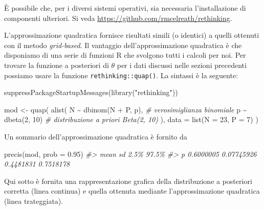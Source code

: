 \documentclass[
]{memoir}
\newenvironment{Shaded}{\begin{snugshade}}{\end{snugshade}}
\newcommand{\AttributeTok}[1]{\textcolor[rgb]{0.77,0.63,0.00}{#1}}
\newcommand{\CommentTok}[1]{\textcolor[rgb]{0.56,0.35,0.01}{\textit{#1}}}
\newcommand{\DecValTok}[1]{\textcolor[rgb]{0.00,0.00,0.81}{#1}}
\newcommand{\FloatTok}[1]{\textcolor[rgb]{0.00,0.00,0.81}{#1}}
\newcommand{\FunctionTok}[1]{\textcolor[rgb]{0.00,0.00,0.00}{#1}}
\newcommand{\NormalTok}[1]{#1}
\newcommand{\OtherTok}[1]{\textcolor[rgb]{0.56,0.35,0.01}{#1}}
\newcommand{\SpecialCharTok}[1]{\textcolor[rgb]{0.00,0.00,0.00}{#1}}
\newcommand{\StringTok}[1]{\textcolor[rgb]{0.31,0.60,0.02}{#1}}
\begin{document}
È possibile che, per i diversi sistemi operativi, sia necessaria l'installazione di componenti ulteriori. Si veda \url{https://github.com/rmcelreath/rethinking}.

L'approssimazione quadratica fornisce risultati simili (o identici) a quelli ottenuti con il metodo \emph{grid-based}. Il vantaggio dell'approssimazione quadratica è che disponiamo di una serie di funzioni R che svolgono tutti i calcoli per noi. Per trovare la funzione a posteriori di \(\theta\) per i dati discussi nelle sezioni precedenti possiamo usare la funzione \texttt{rethinking::quap()}. La sintassi è la seguente:

\begin{Shaded}
\begin{Highlighting}[]
\FunctionTok{suppressPackageStartupMessages}\NormalTok{(}\FunctionTok{library}\NormalTok{(}\StringTok{"rethinking"}\NormalTok{))}

\NormalTok{mod }\OtherTok{\textless{}{-}} \FunctionTok{quap}\NormalTok{(}
  \FunctionTok{alist}\NormalTok{(}
\NormalTok{  N }\SpecialCharTok{\textasciitilde{}} \FunctionTok{dbinom}\NormalTok{(N }\SpecialCharTok{+}\NormalTok{ P, p), }\CommentTok{\# verosimiglianza binomiale}
\NormalTok{  p }\SpecialCharTok{\textasciitilde{}} \FunctionTok{dbeta}\NormalTok{(}\DecValTok{2}\NormalTok{, }\DecValTok{10}\NormalTok{) }\CommentTok{\# distribuzione a priori Beta(2, 10)}
\NormalTok{  ),}
  \AttributeTok{data =} \FunctionTok{list}\NormalTok{(}\AttributeTok{N =} \DecValTok{23}\NormalTok{, }\AttributeTok{P =} \DecValTok{7}\NormalTok{)}
\NormalTok{)}
\end{Highlighting}
\end{Shaded}

Un sommario dell'approssimazione quadratica è fornito da

\begin{Shaded}
\begin{Highlighting}[]
\FunctionTok{precis}\NormalTok{(mod, }\AttributeTok{prob =} \FloatTok{0.95}\NormalTok{)}
\CommentTok{\#\textgreater{}        mean         sd      2.5\%     97.5\%}
\CommentTok{\#\textgreater{} p 0.6000005 0.07745926 0.4481831 0.7518178}
\end{Highlighting}
\end{Shaded}

Qui sotto è fornita una rappresentazione grafica della distribuzione a posteriori corretta (linea continua) e quella ottenuta mediante l'approssimazione quadratica (linea trateggiata).
\end{document}
